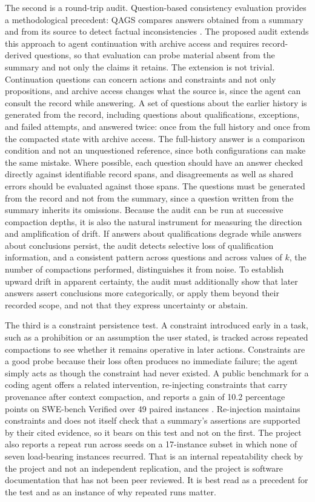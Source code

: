 \documentclass[11pt]{article}
\begin{document}
The second is a round-trip audit. Question-based consistency evaluation provides a methodological precedent: QAGS compares answers obtained from a summary and from its source to detect factual inconsistencies \cite{wang2020}. The proposed audit extends this approach to agent continuation with archive access and requires record-derived questions, so that evaluation can probe material absent from the summary and not only the claims it retains. The extension is not trivial. Continuation questions can concern actions and constraints and not only propositions, and archive access changes what the source is, since the agent can consult the record while answering. A set of questions about the earlier history is generated from the record, including questions about qualifications, exceptions, and failed attempts, and answered twice: once from the full history and once from the compacted state with archive access. The full-history answer is a comparison condition and not an unquestioned reference, since both configurations can make the same mistake. Where possible, each question should have an answer checked directly against identifiable record spans, and disagreements as well as shared errors should be evaluated against those spans. The questions must be generated from the record and not from the summary, since a question written from the summary inherits its omissions. Because the audit can be run at successive compaction depths, it is also the natural instrument for measuring the direction and amplification of drift. If answers about qualifications degrade while answers about conclusions persist, the audit detects selective loss of qualification information, and a consistent pattern across questions and across values of $k$, the number of compactions performed, distinguishes it from noise. To establish upward drift in apparent certainty, the audit must additionally show that later answers assert conclusions more categorically, or apply them beyond their recorded scope, and not that they express uncertainty or abstain.

The third is a constraint persistence test. A constraint introduced early in a task, such as a prohibition or an assumption the user stated, is tracked across repeated compactions to see whether it remains operative in later actions. Constraints are a good probe because their loss often produces no immediate failure; the agent simply acts as though the constraint had never existed. A public benchmark for a coding agent offers a related intervention, re-injecting constraints that carry provenance after context compaction, and reports a gain of 10.2 percentage points on SWE-bench Verified over 49 paired instances \cite{wmm}. Re-injection maintains constraints and does not itself check that a summary's assertions are supported by their cited evidence, so it bears on this test and not on the first. The project also reports a repeat run across seeds on a 17-instance subset in which none of seven load-bearing instances recurred. That is an internal repeatability check by the project and not an independent replication, and the project is software documentation that has not been peer reviewed. It is best read as a precedent for the test and as an instance of why repeated runs matter.
\end{document}
